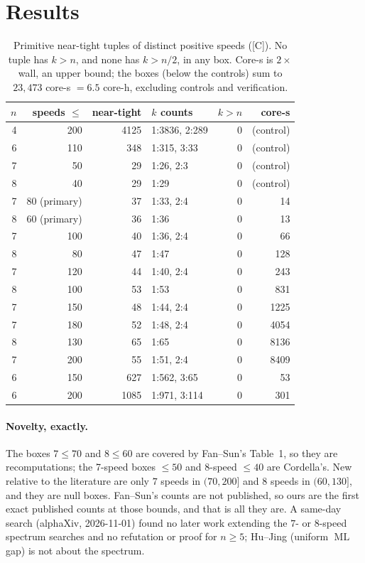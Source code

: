 \documentclass[10pt]{article}
\newcommand{\tier}[1]{\textsf{[#1]}}
\newcommand{\tC}{\tier{C}}
\newcommand{\ML}{\operatorname{ML}}
\begin{document}
\section{Results}\label{sec:res}
\begin{table}[h]\centering\small
\begin{tabular}{@{}rrrlrr@{}}\toprule
$n$ & speeds $\le$ & near-tight & $k$ counts & $k>n$ & core-s\\ \midrule
4 & 200 & 4125 & 1:3836, 2:289 & 0 & (control)\\
6 & 110 & 348 & 1:315, 3:33 & 0 & (control)\\
7 & 50 & 29 & 1:26, 2:3 & 0 & (control)\\
8 & 40 & 29 & 1:29 & 0 & (control)\\
7 & 80 (primary) & 37 & 1:33, 2:4 & 0 & 14\\
8 & 60 (primary) & 36 & 1:36 & 0 & 13\\
7 & 100 & 40 & 1:36, 2:4 & 0 & 66\\
8 & 80 & 47 & 1:47 & 0 & 128\\
7 & 120 & 44 & 1:40, 2:4 & 0 & 243\\
8 & 100 & 53 & 1:53 & 0 & 831\\
7 & 150 & 48 & 1:44, 2:4 & 0 & 1225\\
7 & 180 & 52 & 1:48, 2:4 & 0 & 4054\\
8 & 130 & 65 & 1:65 & 0 & 8136\\
7 & 200 & 55 & 1:51, 2:4 & 0 & 8409\\
6 & 150 & 627 & 1:562, 3:65 & 0 & 53\\
6 & 200 & 1085 & 1:971, 3:114 & 0 & 301\\ \bottomrule
\end{tabular}
\caption{Primitive near-tight tuples of distinct positive speeds (\tC{}). No tuple has $k>n$, and none has $k>n/2$, in any box. Core-s is $2\times$ wall, an upper bound; the boxes (below the controls) sum to $23{,}473$ core-s $=6.5$ core-h, excluding controls and verification.}\label{tab:res}
\end{table}
\paragraph{Novelty, exactly.} The boxes $7\le70$ and $8\le60$ are covered by Fan--Sun's Table~1, so they are recomputations; the 7-speed boxes $\le50$ and 8-speed $\le40$ are Cordella's. New relative to the literature are only $7$ speeds in $(70,200]$ and $8$ speeds in $(60,130]$, and they are null boxes. Fan--Sun's counts are not published, so ours are the first exact published counts at those bounds, and that is all they are. A same-day search (alphaXiv, 2026-11-01) found no later work extending the $7$- or $8$-speed spectrum searches and no refutation or proof for $n\ge5$; Hu--Jing \cite{hj} (uniform $\ML$ gap) is not about the spectrum.
\end{document}
